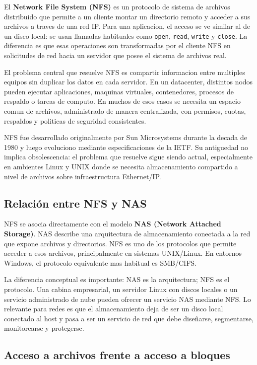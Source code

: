 El \textbf{Network File System (NFS)} es un protocolo de sistema de archivos distribuido que permite a un cliente montar un directorio remoto y acceder a sus archivos a traves de una red IP. Para una aplicacion, el acceso se ve similar al de un disco local: se usan llamadas habituales como \texttt{open}, \texttt{read}, \texttt{write} y \texttt{close}. La diferencia es que esas operaciones son transformadas por el cliente NFS en solicitudes de red hacia un servidor que posee el sistema de archivos real.

El problema central que resuelve NFS es compartir informacion entre multiples equipos sin duplicar los datos en cada servidor. En un datacenter, distintos nodos pueden ejecutar aplicaciones, maquinas virtuales, contenedores, procesos de respaldo o tareas de computo. En muchos de esos casos se necesita un espacio comun de archivos, administrado de manera centralizada, con permisos, cuotas, respaldos y politicas de seguridad consistentes.

NFS fue desarrollado originalmente por Sun Microsystems durante la decada de 1980 y luego evoluciono mediante especificaciones de la IETF. Su antiguedad no implica obsolescencia: el problema que resuelve sigue siendo actual, especialmente en ambientes Linux y UNIX donde se necesita almacenamiento compartido a nivel de archivos sobre infraestructura Ethernet/IP.

\subsection{Relación entre NFS y NAS}

NFS se asocia directamente con el modelo \textbf{NAS (Network Attached Storage)}. NAS describe una arquitectura de almacenamiento conectada a la red que expone archivos y directorios. NFS es uno de los protocolos que permite acceder a esos archivos, principalmente en sistemas UNIX/Linux. En entornos Windows, el protocolo equivalente mas habitual es SMB/CIFS.

La diferencia conceptual es importante: NAS es la arquitectura; NFS es el protocolo. Una cabina empresarial, un servidor Linux con discos locales o un servicio administrado de nube pueden ofrecer un servicio NAS mediante NFS. Lo relevante para redes es que el almacenamiento deja de ser un disco local conectado al host y pasa a ser un servicio de red que debe diseñarse, segmentarse, monitorearse y protegerse.

\subsection{Acceso a archivos frente a acceso a bloques}


